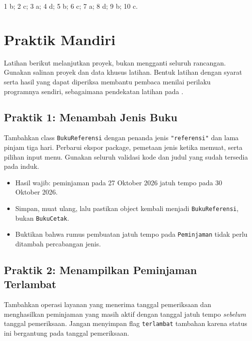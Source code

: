 \begin{info}
1 b; 2 c; 3 a; 4 d; 5 b; 6 c; 7 a; 8 d; 9 b; 10 c.
\end{info}

\section{Praktik Mandiri}

Latihan berikut melanjutkan proyek, bukan mengganti seluruh rancangan. Gunakan salinan proyek dan data khusus latihan. Bentuk latihan dengan syarat serta hasil yang dapat diperiksa membantu pembaca menilai perilaku programnya sendiri, sebagaimana pendekatan latihan pada \cite{edcornerOopExercises}.

\subsection{Praktik 1: Menambah Jenis Buku}

Tambahkan class \texttt{BukuReferensi} dengan penanda jenis \texttt{"referensi"} dan lama pinjam tiga hari. Perbarui ekspor package, pemetaan jenis ketika memuat, serta pilihan input menu. Gunakan seluruh validasi kode dan judul yang sudah tersedia pada induk.

\begin{itemize}
  \item Hasil wajib: peminjaman pada 27 Oktober 2026 jatuh tempo pada 30 Oktober 2026.
  \item Simpan, muat ulang, lalu pastikan object kembali menjadi \texttt{BukuReferensi}, bukan \texttt{BukuCetak}.
  \item Buktikan bahwa rumus pembuatan jatuh tempo pada \texttt{Peminjaman} tidak perlu ditambah percabangan jenis.
\end{itemize}

\subsection{Praktik 2: Menampilkan Peminjaman Terlambat}

Tambahkan operasi layanan yang menerima tanggal pemeriksaan dan menghasilkan peminjaman yang masih aktif dengan tanggal jatuh tempo \emph{sebelum} tanggal pemeriksaan. Jangan menyimpan flag \texttt{terlambat} tambahan karena status ini bergantung pada tanggal pemeriksaan.

